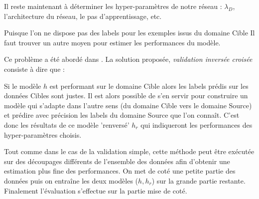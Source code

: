 Il reste maintenant à déterminer les hyper-paramètres de notre réseau : 
$\lambda_{D}$, l'architecture du réseau, le pas d'apprentissage, etc.

Puisque l'on ne dispose pas des labels pour les exemples issus du domaine Cible
Il faut trouver un autre moyen pour estimer les performances du modèle.

Ce problème a été abordé dans \cite{Zhong}. La solution proposée, \emph{validation 
inversée croisée} consiste à dire que :

Si le modèle $h$ est performant sur le domaine Cible alors les labels 
prédis sur les données Cibles sont justes. Il est alors possible de s'en servir
pour construire un modèle qui s'adapte dans l'autre sens (du domaine Cible 
vers le domaine Source) et prédire avec précision les labels du domaine Source
que l'on connaît. C'est donc les résultats de ce modèle 'renversé' $h_r$ qui 
indiqueront les performances des hyper-paramètres choisis. 

Tout comme dans le cas de la validation simple, cette méthode peut être 
exécutée sur des découpages différents de l'ensemble des données
afin d'obtenir une estimation plus fine des performances. 
On met de coté une petite partie des données puis on entraîne les deux modèles
($h,h_r$) sur la grande partie restante. Finalement l'évaluation 
s'effectue sur la partie mise de coté.

